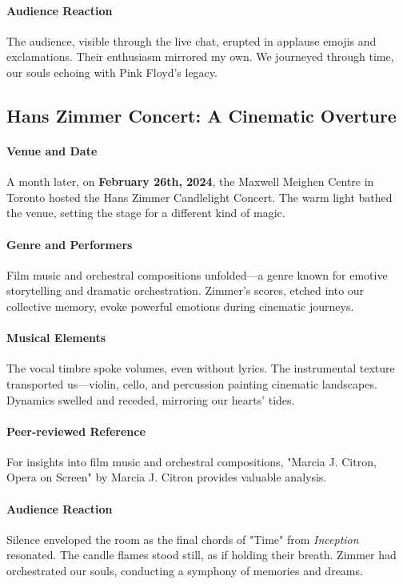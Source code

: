 \paragraph{Audience Reaction}
The audience, visible through the live chat, erupted in applause emojis and exclamations. Their enthusiasm mirrored my own. We journeyed through time, our souls echoing with Pink Floyd's legacy.

\subsection{Hans Zimmer Concert: A Cinematic Overture}
\paragraph{Venue and Date}
A month later, on \textbf{February 26th, 2024}, the Maxwell Meighen Centre in Toronto hosted the Hans Zimmer Candlelight Concert. The warm light bathed the venue, setting the stage for a different kind of magic.

\paragraph{Genre and Performers}
Film music and orchestral compositions unfolded—a genre known for emotive storytelling and dramatic orchestration. Zimmer's scores, etched into our collective memory, evoke powerful emotions during cinematic journeys.

\paragraph{Musical Elements}
The vocal timbre spoke volumes, even without lyrics. The instrumental texture transported us—violin, cello, and percussion painting cinematic landscapes. Dynamics swelled and receded, mirroring our hearts' tides.

\paragraph{Peer-reviewed Reference}
For insights into film music and orchestral compositions, "Marcia J. Citron, Opera on Screen" by Marcia J. Citron\autocite{citron2000opera} provides valuable analysis.

\paragraph{Audience Reaction}
Silence enveloped the room as the final chords of "Time" from \textit{Inception} resonated. The candle flames stood still, as if holding their breath. Zimmer had orchestrated our souls, conducting a symphony of memories and dreams.

